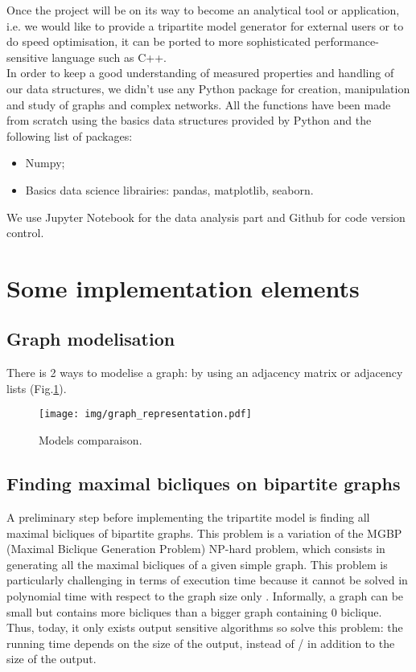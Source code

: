 \documentclass[table]{report}
\begin{document}
Once the project will be on its way to become an analytical tool or application, i.e. we would like to provide a tripartite model generator for external users or to do speed optimisation, it can be ported to more sophisticated performance-sensitive language such as C++. \\


In order to keep a good understanding of measured properties and handling of our data structures, we didn't use any Python package for creation, manipulation and study of graphs and complex networks. All the functions have been made from scratch using the basics data structures provided by Python and the following list of packages:
\begin{itemize}[noitemsep]
    \item Numpy;
    \item Basics data science librairies: pandas, matplotlib, seaborn.
\end{itemize}

We use Jupyter Notebook for the data analysis part and Github for code version control.



\section{Some implementation elements}

\subsection{Graph modelisation}

There is 2 ways to modelise a graph: by using an adjacency matrix or adjacency lists (Fig.\ref{fig:graph_representation}).


\begin{figure}[h]%
\centering
\texttt{[image: img/graph\_representation.pdf]}
\caption{Models comparaison.}
\label{fig:graph_representation}
\end{figure}
\FloatBarrier


\subsection{Finding maximal bicliques on bipartite graphs}

A preliminary step before implementing the tripartite model is finding all maximal bicliques of bipartite graphs. This problem is a variation of the MGBP (Maximal Biclique Generation Problem) NP-hard problem, which consists in  generating all the maximal bicliques of a given simple graph. This problem is particularly challenging in terms of execution time because it cannot be solved in polynomial time with respect to the graph size only \cite{eppstein}.  Informally, a graph can be small but contains more bicliques than a bigger graph containing 0 biclique. Thus, today, it only exists output sensitive algorithms so solve this problem: the running time depends on the size of the output, instead of / in addition to the size of the output.
\end{document}
